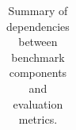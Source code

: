 \begin{table}[t]
\begin{center}
{\begin{tabular}{ll|ccc}

            \end{tabular}
        \caption{Summary of dependencies between benchmark components and evaluation metrics.} 
        \label{Table:component-variance}
        }
        \end{center}
    \end{table}

